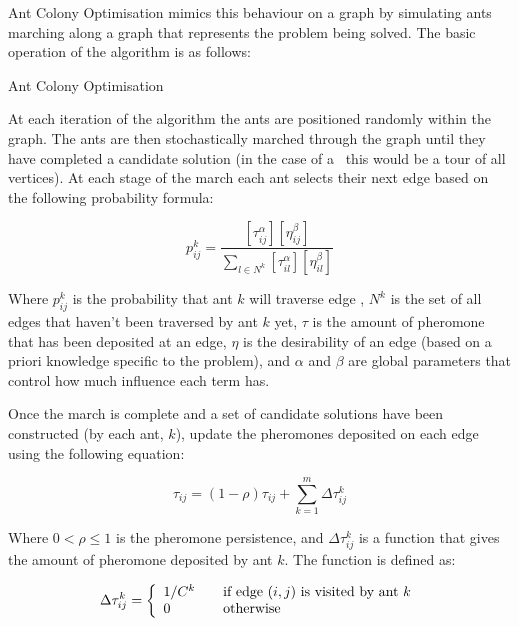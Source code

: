 
Ant Colony Optimisation mimics this behaviour on a graph by simulating ants marching along a graph that represents the problem being solved. The basic operation of the algorithm is as follows: 

\begin{algorithm}[H]
   \caption{Ant Colony Optimisation}
\end{algorithm}
 
At each iteration of the algorithm the ants are positioned randomly within the graph. The ants are then stochastically marched through the graph until they have completed a candidate solution (in the case of a \TSP\ this would be a tour of all vertices). At each stage of the march each ant selects their next edge based on the following probability formula:

\[
   p_{ij}^k = \frac{ [\tau_{ij}^{\alpha}] [\eta_{ij}^{\beta}] }{ \sum_{l \in N^k} [\tau_{il}^{\alpha}] [\eta_{il}^{\beta}] }
\]

Where $p_{ij}^k$ is the probability that ant $k$ will traverse edge , $N^k$ is the set of all edges that haven't been traversed by ant $k$ yet, $\tau$ is the amount of pheromone that has been deposited at an edge, $\eta$ is the desirability of an edge (based on a priori knowledge specific to the problem), and $\alpha$ and $\beta$ are global parameters that control how much influence each term has.

Once the march is complete and a set of candidate solutions have been constructed (by each ant, $k$), update the pheromones deposited on each edge using the following equation:

\[
   \tau_{ij} = (1 - \rho) \tau_{ij} + \sum_{k=1}^m \Delta \tau_{ij}^k
\]

Where $0 < \rho \le 1$ is the pheromone persistence, and $\Delta \tau_{ij}^k$ is a function that gives the amount of pheromone deposited by ant $k$. The function is defined as:

\[
   \Delta \tau_{ij}^k = \left\{
   \begin{array}{l l}
     1 / C^k & \quad \text{if edge $(i,j)$ is visited by ant $k$} \\
     0       & \quad \text{otherwise} \\
   \end{array} \right.
\]

